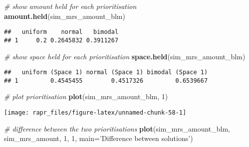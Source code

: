\documentclass[11pt,]{article}
\newenvironment{Shaded}{\begin{snugshade}}{\end{snugshade}}
\newcommand{\KeywordTok}[1]{\textcolor[rgb]{0.13,0.29,0.53}{\textbf{{#1}}}}
\newcommand{\DataTypeTok}[1]{\textcolor[rgb]{0.13,0.29,0.53}{{#1}}}
\newcommand{\DecValTok}[1]{\textcolor[rgb]{0.00,0.00,0.81}{{#1}}}
\newcommand{\StringTok}[1]{\textcolor[rgb]{0.31,0.60,0.02}{{#1}}}
\newcommand{\CommentTok}[1]{\textcolor[rgb]{0.56,0.35,0.01}{\textit{{#1}}}}
\newcommand{\NormalTok}[1]{{#1}}
\let\origfigure\figure
\let\endorigfigure\endfigure
\renewenvironment{figure}[1][2] {
	\expandafter\origfigure\expandafter[H]
} {
	\endorigfigure
}
\begin{document}
\begin{Shaded}
\begin{Highlighting}[]
\CommentTok{# show amount held for each prioritisation}
\KeywordTok{amount.held}\NormalTok{(sim_mrs_amount_blm)}
\end{Highlighting}
\end{Shaded}

\begin{verbatim}
##   uniform    normal   bimodal
## 1     0.2 0.2645832 0.3911267
\end{verbatim}

\begin{Shaded}
\begin{Highlighting}[]
\CommentTok{# show space held for each prioritisation}
\KeywordTok{space.held}\NormalTok{(sim_mrs_amount_blm)}
\end{Highlighting}
\end{Shaded}

\begin{verbatim}
##   uniform (Space 1) normal (Space 1) bimodal (Space 1)
## 1         0.4545455        0.4517326         0.6539667
\end{verbatim}

\begin{Shaded}
\begin{Highlighting}[]
\CommentTok{# plot prioritisation}
\KeywordTok{plot}\NormalTok{(sim_mrs_amount_blm, }\DecValTok{1}\NormalTok{)}
\end{Highlighting}
\end{Shaded}

\begin{figure}

{\centering \texttt{[image: rapr\_files/figure-latex/unnamed-chunk-58-1]} 

}

\caption{A multi-species prioritisation for the uniformly, normally, and bimodally distributed species generated using only amount-based targets (20\%). Additionally, this priorititisation was specified to have high connectivity, by using a high $BLM$ parameter. See Figure 12 caption for conventions.}\label{fig:unnamed-chunk-58}
\end{figure}

\begin{Shaded}
\begin{Highlighting}[]
\CommentTok{# difference between the two prioritisations}
\KeywordTok{plot}\NormalTok{(sim_mrs_amount_blm, sim_mrs_amount, }\DecValTok{1}\NormalTok{, }\DecValTok{1}\NormalTok{, }\DataTypeTok{main=}\StringTok{'Difference between solutions'}\NormalTok{)}
\end{Highlighting}
\end{Shaded}
\end{document}

